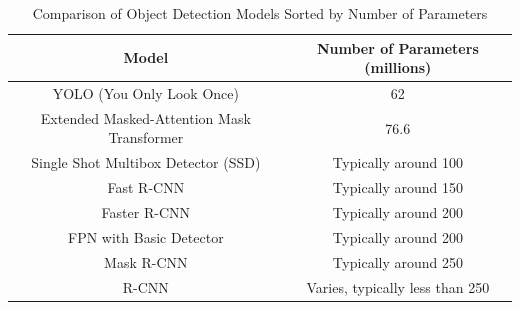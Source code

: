\begin{table}[h]
    \centering
    \begin{tabular}{|c|c|}
    \hline
    \textbf{Model}                                 & \textbf{Number of Parameters (millions)} \\ \hline
    YOLO (You Only Look Once)                      & 62                                      \\ \hline
    Extended Masked-Attention Mask Transformer     & 76.6                                    \\ \hline
    Single Shot    Multibox Detector (SSD)         & Typically around 100                    \\ \hline
    Fast R-CNN                                     & Typically around 150                    \\ \hline
    Faster R-CNN                                   & Typically around 200                    \\ \hline
    FPN with Basic Detector                        & Typically around 200                    \\ \hline
    Mask R-CNN                                     & Typically around 250                    \\ \hline
    R-CNN                                          & Varies, typically less than 250         \\ \hline
    \end{tabular}
    \caption{Comparison of Object Detection Models Sorted by Number of Parameters}
    \label{tab:model_parameters}
    \end{table}
    

